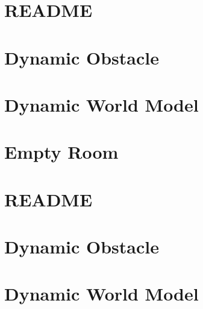 \let\mypdfximage\pdfximage\def\pdfximage{\immediate\mypdfximage}\documentclass[twoside]{book}
\newcommand{\+}{\discretionary{\mbox{\scriptsize$\hookleftarrow$}}{}{}}
\begin{document}
\chapter{README}
\label{md_smacc2_sm_reference_library_sm_branching_README}

\chapter{Dynamic Obstacle}
\label{md_smacc2_sm_reference_library_sm_dance_bot_models_dynamic_obstacle_README}

\chapter{Dynamic World Model}
\label{md_smacc2_sm_reference_library_sm_dance_bot_models_dynamic_world_README}

\chapter{Empty Room}
\label{md_smacc2_sm_reference_library_sm_dance_bot_models_empty_room_README}

\chapter{README}
\label{md_smacc2_sm_reference_library_sm_dance_bot_README}

\chapter{Dynamic Obstacle}
\label{md_smacc2_sm_reference_library_sm_dance_bot_lite_models_dynamic_obstacle_README}

\chapter{Dynamic World Model}
\label{md_smacc2_sm_reference_library_sm_dance_bot_lite_models_dynamic_world_README}

\end{document}
